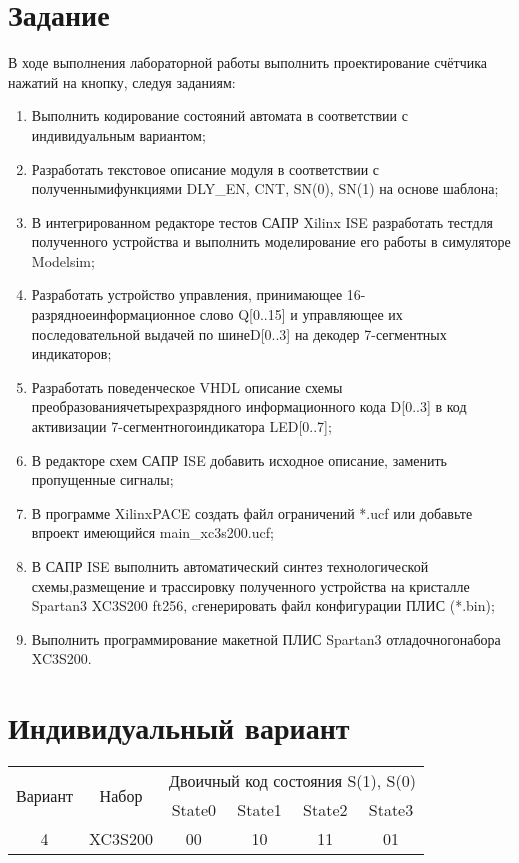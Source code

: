 \documentclass[a4paper, 14pt]{extarticle}
\begin{document}
    \section*{Задание}
    В ходе выполнения лабораторной работы выполнить проектирование счётчика нажатий на кнопку, следуя заданиям:
    \begin{enumerate}
        \item Выполнить   кодирование   состояний   автомата в соответствии с индивидуальным вариантом;
        \item Разработать текстовое описание модуля в соответствии с полученнымифункциями DLY\_EN, CNT, SN(0), SN(1) на основе шаблона;
        \item В интегрированном редакторе тестов САПР Xilinx ISE разработать тестдля полученного устройства и выполнить моделирование его работы в симуляторе Modelsim;
        \item Разработать   устройство   управления,   принимающее   16-разрядноеинформационное слово  Q[0..15] и управляющее их последовательной выдачей по шинеD[0..3] на декодер 7-сегментных индикаторов;
        \item Разработать   поведенческое  VHDL  описание   схемы   преобразованиячетырехразрядного   информационного   кода  D[0..3]   в   код   активизации   7-сегментногоиндикатора LED[0..7];
        \item В редакторе схем САПР ISE добавить исходное описание, заменить   пропущенные   сигналы;
        \item  В программе XilinxPACE создать файл ограничений *.ucf  или добавьте впроект имеющийся main\_xc3s200.ucf;
        \item  В САПР ISE выполнить автоматический синтез технологической схемы,размещение и трассировку  полученного устройства на кристалле  Spartan3 XC3S200 ft256, cгенерировать файл конфигурации ПЛИС (*.bin);
        \item Выполнить программирование макетной ПЛИС  Spartan3 отладочногонабора XC3S200.
    \end{enumerate}
    \section*{Индивидуальный вариант}
    \begin{table}[H]
        \begin{center}
            \begin{tabular}{|c|c|c|c|c|c|}
                \hline
                \multirow{2}{*}{Вариант} & \multirow{2}{*}{Набор} & \multicolumn{4}{|c|}{Двоичный код состояния S(1), S(0) } \\
                \cline{3-6}
                & &State0 &State1 &State2 &State3 \\
                \hline
                4 & XC3S200 & 00& 10 & 11 & 01 \\
                \hline
            \end{tabular}
        \end{center}
    \end{table}
    \pagebreak
\end{document}
